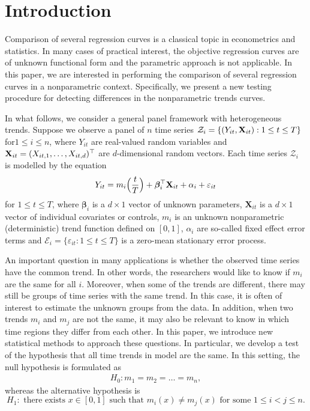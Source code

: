 \documentclass[a4paper,12pt]{article}
\makeatletter
\renewcommand{\eqref}[1]{\tagform@{\ref{#1}}}
\makeatother
\begin{document}
%

\section{Introduction}\label{sec:intro}

Comparison of several regression curves is a classical topic in econometrics and statistics. In many cases of practical interest, the objective regression curves are of unknown functional form and the parametric approach is not applicable. In this paper, we are interested in performing the comparison of several regression curves in a nonparametric context. Specifically, we present a new testing procedure for detecting differences in the nonparametric trends curves. 

In what follows, we consider a general panel framework with heterogeneous trends. Suppose we observe a panel of $n$ time series $\mathcal{Z}_i = \{ (Y_{it},\mathbf{X}_{it}): 1 \le t \le T \}$ for\linebreak $1 \le i \le n$, where $Y_{it}$ are real-valued random variables and $\mathbf{X}_{it} = (X_{it,1},\ldots,X_{it,d})^\top$ are $d$-dimensional random vectors. Each time series $\mathcal{Z}_i$ is modelled by the equation
\begin{equation}\label{eq:model}
Y_{it} = m_i \Big( \frac{t}{T} \Big) + \bm{\beta}_i^\top \mathbf{X}_{it} + \alpha_i + \varepsilon_{it}
\end{equation}
for $1 \le t \le T$, where $\bm{\beta}_i$ is a $d \times 1$ vector of unknown parameters, $\mathbf{X}_{it}$ is a $d\times 1$ vector of individual covariates or controls, $m_i$ is an unknown nonparametric (deterministic) trend function defined on $[0,1]$, $\alpha_i$ are so-called fixed effect error terms and \linebreak $\mathcal{E}_i = \{ \varepsilon_{it}: 1 \le t \le T \}$ is a zero-mean stationary error process. 


An important question in many applications is whether the observed time series have the common trend. In other words, the researchers would like to know if $m_i$ are the same for all $i$. Moreover, when some of the trends are different, there may still be groups of time series with the same trend. In this case, it is often of interest to estimate the unknown groups from the data. In addition, when two trends $m_i$ and $m_j$ are not the same, it may also be relevant to know in which time regions they differ from each other. In this paper, we introduce new statistical methods to approach these questions. In particular, we develop a test of the hypothesis that all time trends in model \eqref{eq:model} are the same. In this setting, the null hypothesis is formulated as 
\begin{align}\label{eq:null}
H_0: m_1 = m_2 = \ldots = m_n,
\end{align}
whereas the alternative hypothesis is 
$$H_1: \text{ there exists } x\in [0, 1] \text{ such that } m_i (x) \neq m_j(x) \text{ for some } 1\leq i < j \leq n.$$
\end{document}
